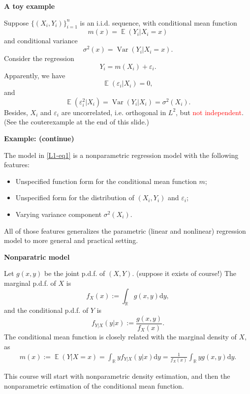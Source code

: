 \documentclass[19pt,landscaoe]{article}
\DeclareMathOperator{\E}{\mathbb{E}}
\newcommand{\R}{\mathbb{R}}
\DeclareMathOperator{\Var}{\mathrm{Var}}
\begin{document}
\newpage
{\LARGE\centerline{\textbf{A toy example}}}
\vskip25pt
\begin{minipage}{.9\textwidth}
    \Large 
Suppose $\big\{(X_i,Y_i)\big\}_{i=1}^n$ is an i.i.d. sequence, with conditional mean function
$$m(x)=\E(Y_i|X_i=x)$$ 
and conditional variance $$\sigma^2(x)=\Var(Y_i|X_i=x).$$
Consider the regression 
\begin{equation}\label{L1-eq1}
    Y_i=m(X_i)+\varepsilon_i.
\end{equation}
Apparently, we have 
$$\E(\varepsilon_i|X_i)=0,$$ and
$$\E(\varepsilon_i^2|X_i)=\Var(Y_i|X_i)=\sigma^2(X_i).$$
Besides, $X_i$ and $\varepsilon_i$ are uncorrelated, i.e. orthogonal in $L^2$, but \textcolor{red}{not independent}.  (See the couterexample at the end of this slide.) 
\end{minipage}

\newpage
{\LARGE{\textbf{Example: (continue)}}}
\vskip25pt
\begin{minipage}{.9\textwidth}
    \Large 
The model in \eqref{L1-eq1} is a nonparametric regression model with the following features:
\begin{itemize}
    \item Unspecified function form for the conditional mean function $m$;
    \item Unspecified form for the distribution of $(X_i,Y_i)$ and $\varepsilon_i$;
    \item Varying variance component $\sigma^2(X_i)$.
\end{itemize}
All of those features generalizes the parametric (linear and nonlinear) regression model to more general and practical setting. 
\end{minipage}

\newpage
{\LARGE{\textbf{Nonparatric model}}}
\vskip15pt
\begin{minipage}{.9\textwidth}
    \Large 
Let $g(x,y)$ be the joint p.d.f. of $(X,Y)$. (suppose it exists of course!) The marginal p.d.f. of $X$ is 
$$f_X(x):=\int_{\R}g(x,y)\mathrm{d}y,$$
and the conditional p.d.f. of $Y$ is 
$$f_{Y|X}(y|x):=\frac{g(x,y)}{f_X(x)}.$$
The conditional mean function is closely related with the marginal density of $X$, as 
\begin{eqnarray*}
    m(x):=\E(Y|X=x)=\int_{\R}yf_{Y|X}(y|x)\mathrm{d}y=\frac1{f_X(x)}\int_{\R}yg(x,y)\mathrm{d}y.
\end{eqnarray*}

This course will start with nonparametric density estimation, and then the nonparametric estimation of the conditional mean function. 
\end{minipage}
\end{document}
